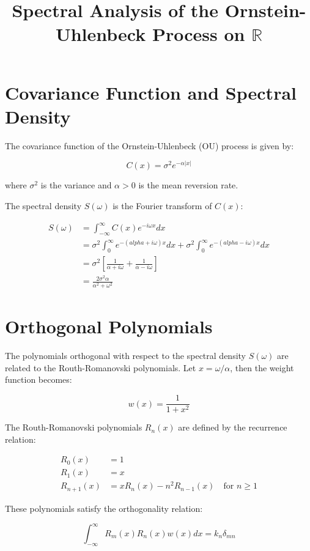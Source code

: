 \documentclass{article}
\title{Spectral Analysis of the Ornstein-Uhlenbeck Process on $\mathbb{R}$}
\author{}
\date{}
\begin{document}
\maketitle

\section{Covariance Function and Spectral Density}

The covariance function of the Ornstein-Uhlenbeck (OU) process is given by:

\[ C(x) = \sigma^2 e^{-\alpha|x|} \]

where $\sigma^2$ is the variance and $\alpha > 0$ is the mean reversion rate.

The spectral density $S(\omega)$ is the Fourier transform of $C(x)$:

\begin{align*}
S(\omega) &= \int_{-\infty}^{\infty} C(x) e^{-i\omega x} dx \\
&= \sigma^2 \int_{0}^{\infty} e^{-(
alpha+i\omega)x} dx + \sigma^2 \int_{0}^{\infty} e^{-(
alpha-i\omega)x} dx \\
&= \sigma^2 \left[\frac{1}{\alpha+i\omega} + \frac{1}{\alpha-i\omega}\right] \\
&= \frac{2\sigma^2\alpha}{\alpha^2+\omega^2}
\end{align*}

\section{Orthogonal Polynomials}

The polynomials orthogonal with respect to the spectral density $S(\omega)$ are related to the Routh-Romanovski polynomials. Let $x = \omega/\alpha$, then the weight function becomes:

\[ w(x) = \frac{1}{1+x^2} \]

The Routh-Romanovski polynomials $R_n(x)$ are defined by the recurrence relation:

\begin{align*}
R_0(x) &= 1 \\
R_1(x) &= x \\
R_{n+1}(x) &= x R_n(x) - n^2 R_{n-1}(x) \quad \text{for } n \geq 1
\end{align*}

These polynomials satisfy the orthogonality relation:

\[ \int_{-\infty}^{\infty} R_m(x) R_n(x) w(x) dx = k_n \delta_{mn} \]
\end{document}
